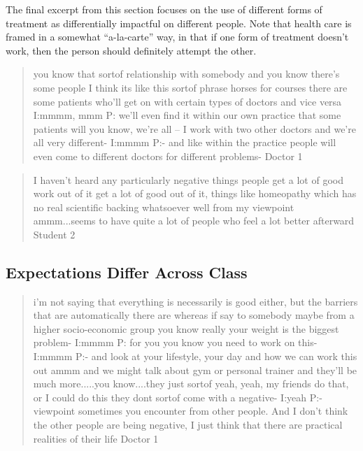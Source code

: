 The final excerpt from this section focuses on the use of different forms of treatment as differentially impactful on different people. Note that health care is framed in a somewhat ``a-la-carte'' way, in that if one form of treatment doesn't work, then the person should definitely attempt the other. 

\begin{quotation}
  
you know that sortof relationship with somebody and you know there's some people I think its like this sortof phrase horses for courses there are some patients who'll get on with certain types of doctors and vice versa
I:mmmm, mmm
P: we'll even find it within our own practice that some patients will you know, we're all – I work with two other doctors and we're all very different-
I:mmmm
P:- and like within the practice people will even come to different doctors for different problems-
Doctor 1
\end{quotation}

\begin{quotation}
  I haven't heard any particularly negative things people get a lot of good work out of it get a lot of good out of it, things like homeopathy which has no real scientific backing whatsoever well from my viewpoint ammm...seems to have quite a lot of people who feel a lot better afterward
Student 2
\end{quotation}

\subsection{Expectations Differ Across Class}
\label{sec:expect-diff-across}

\begin{quotation}
 i'm not saying that everything is necessarily is good either, but the barriers that are automatically there are whereas if say to somebody maybe from a higher socio-economic group you know really your weight is the biggest problem-
I:mmmm
P: for you you know you need to work on this-
I:mmmm
P:- and look at your lifestyle, your day and how we can work this out ammm and we might talk about gym or personal trainer and they'll be much more.....you know....they just sortof yeah, yeah, my friends do that, or I could do this they dont sortof come with a negative-
I:yeah
P:-viewpoint sometimes you encounter from other people. And I don't think the other people are being negative, I just think that there are practical realities of their life
  Doctor 1
\end{quotation}

